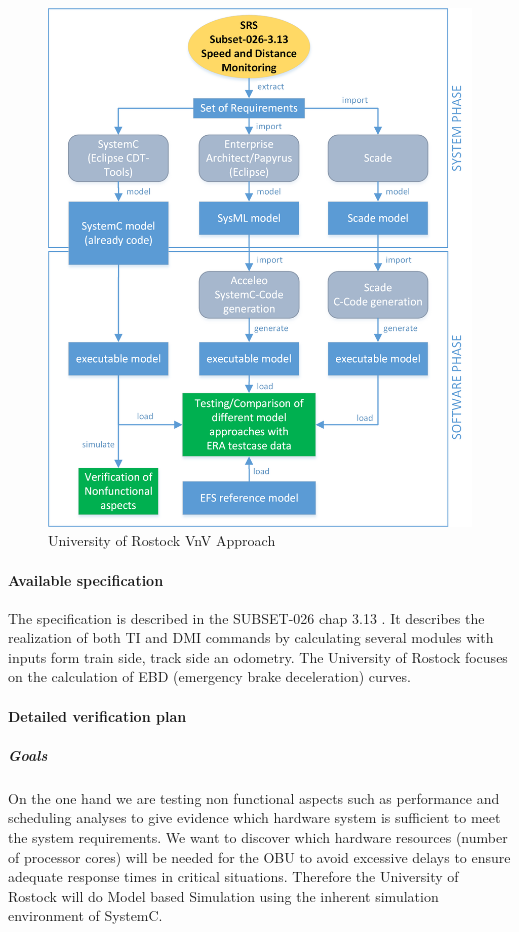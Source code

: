 \documentclass{article}
\begin{document}
\begin{figure}[h]
\centering
\includegraphics[width=.80\textwidth]{schema/UniRostockApproach.png}
\vspace{4mm}
\caption{University of Rostock VnV Approach}
\label{fig:University of Rostock VnV Approach} 
\end{figure}

\paragraph{Available specification}

The specification is described in the
SUBSET-026\cite{unisig_subset-026_2012} chap 3.13 \cite{chap3-13}. It describes the realization of both TI and DMI commands by calculating several modules with inputs form train side, track side an odometry. The University of Rostock focuses on the calculation of EBD (emergency brake deceleration) curves.

\paragraph{Detailed verification plan}

\subparagraph{Goals}

On the one hand we are testing non functional aspects such as performance and scheduling analyses to give evidence which hardware system is sufficient to meet the system requirements. We want to discover which  hardware resources (number of processor cores) will be needed for the OBU to avoid excessive delays to ensure adequate response times in critical situations. Therefore the University of Rostock will do Model based Simulation using the inherent simulation environment of SystemC.
\end{document}
